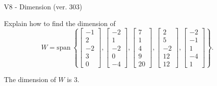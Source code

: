 \begin{exercise}
  \begin{exerciseTitle}V8 - Dimension (ver. 303)\end{exerciseTitle}
  \begin{exerciseStatement}
    Explain how to find the dimension of 
\[W=\mathrm{span}\ \left\{\left[\begin{array}{r}
-1 \\
2 \\
-2 \\
3 \\
0
\end{array}\right] , \left[\begin{array}{r}
-2 \\
1 \\
-2 \\
0 \\
-4
\end{array}\right] , \left[\begin{array}{r}
7 \\
1 \\
4 \\
9 \\
20
\end{array}\right] , \left[\begin{array}{r}
2 \\
5 \\
-2 \\
12 \\
12
\end{array}\right] , \left[\begin{array}{r}
-2 \\
-1 \\
1 \\
-4 \\
1
\end{array}\right]\right\}.\]



  \end{exerciseStatement}
  \begin{exerciseAnswer}
   The dimension of \(W\) is  \(3\).
  


  \end{exerciseAnswer}
\end{exercise}